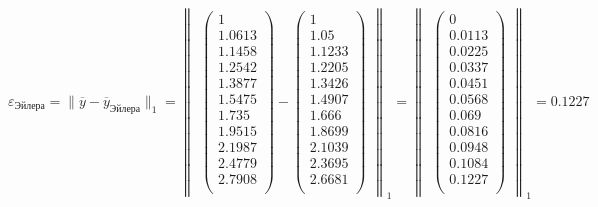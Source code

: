 \documentclass[10pt, a4paper]{scrartcl}
\begin{document}
\(\displaystyle \varepsilon_{\text{Эйлера}} = \parallel \overline{y} - \overline{y}_{\text{Эйлера}} \parallel _1 = \begin{Vmatrix} \begin{pmatrix} 1\\ 1.0613\\ 1.1458\\ 1.2542\\ 1.3877\\ 1.5475\\ 1.735\\ 1.9515\\ 2.1987\\ 2.4779\\ 2.7908\\ \end{pmatrix} - \begin{pmatrix} 1\\ 1.05\\ 1.1233\\ 1.2205\\ 1.3426\\ 1.4907\\ 1.666\\ 1.8699\\ 2.1039\\ 2.3695\\ 2.6681\\ \end{pmatrix} \end{Vmatrix} _1 = \begin{Vmatrix} \begin{pmatrix} 0\\ 0.0113\\ 0.0225\\ 0.0337\\ 0.0451\\ 0.0568\\ 0.069\\ 0.0816\\ 0.0948\\ 0.1084\\ 0.1227\\ \end{pmatrix}\end{Vmatrix} _1 = 0.1227\)
\end{document}
